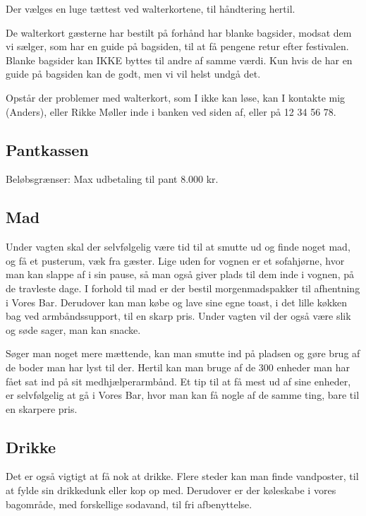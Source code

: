 Der vælges en luge tættest ved walterkortene, til håndtering hertil.

De walterkort gæsterne har bestilt på forhånd har blanke bagsider, modsat dem vi sælger,
som har en guide på bagsiden, til at få pengene retur efter festivalen.
Blanke bagsider kan IKKE byttes til andre af samme værdi. Kun hvis de har en guide på bagsiden 
kan de godt, men vi vil helst undgå det.

Opstår der problemer med walterkort, som I ikke kan løse, kan I kontakte mig (Anders), eller Rikke Møller 
inde i banken ved siden af, eller på 12 34 56 78. 

\subsection{Pantkassen}
Beløbsgrænser: Max udbetaling til pant 8.000 kr. 

\subsection{Mad}

Under vagten skal der selvfølgelig være tid til at smutte ud og finde noget mad, og få et 
pusterum, væk fra gæster. Lige uden for vognen er et sofahjørne, hvor man kan slappe af i 
sin pause, så man også giver plads til dem inde i vognen, på de travleste dage.
I forhold til mad er der bestil morgenmadspakker til afhentning i Vores Bar. 
Derudover kan man købe og lave sine egne toast, i det lille køkken bag ved armbåndssupport, 
til en skarp pris. Under vagten vil der også være slik og søde sager, man kan snacke.

Søger man noget mere mættende, kan man smutte ind på pladsen og gøre brug af de boder man har lyst til der.
Hertil kan man bruge af de 300 enheder man har fået sat ind på sit medhjælperarmbånd. Et tip til at få mest 
ud af sine enheder, er selvfølgelig at gå i Vores Bar, hvor man kan få nogle af de samme ting, bare til en 
skarpere pris.

\subsection{Drikke}

Det er også vigtigt at få nok at drikke.
Flere steder kan man finde vandposter, til at fylde sin drikkedunk eller kop op med.
Derudover er der køleskabe i vores bagområde, med forskellige sodavand, til fri 
afbenyttelse. 


